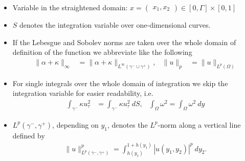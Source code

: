 \documentclass{article}
\theoremstyle{definition}
\theoremstyle{definition}
\begin{document}
\begin{itemize}
    \item
    Variable in the straightened domain: $x=\begin{pmatrix}x_1,x_2\end{pmatrix}\in [0,\Gamma]\times[0,1]$
    \\
    \item
    $S$ denotes the integration variable over one-dimensional curves.
    \\
    \item
    If the Lebesgue and Sobolev norms are taken over the whole domain of definition of the function we abbreviate like the following
    \begin{align*}
        \|\alpha+\kappa\|_\infty &= \|\alpha+\kappa\|_{L^\infty(\gamma^-\cup\gamma^+)}, & \|u\|_p &= \|u\|_{L^p(\Omega)}
    \end{align*}
    \item
    For single integrals over the whole domain of integration we skip the integration variable for easier readability, i.e.
    \begin{align*}
        \int_{\gamma^-} \kappa u_\tau^2 &= \int_{\gamma^-} \kappa u_\tau^2 \ dS, & \int_\Omega \omega^2 = \int_{\Omega} \omega^2 \ dy
    \end{align*}
    \item
    $L^p(\gamma^-,\gamma^+)$, depending on $y_1$, denotes the $L^p$-norm along a vertical line defined by
    \begin{align*}
        \|u\|_{L^p(\gamma^-,\gamma^+)}^p=\int_{h(y_1)}^{1+h(y_1)} |u(y_1,y_2)|^p\ dy_2.
    \end{align*}
\end{itemize}
\end{document}
